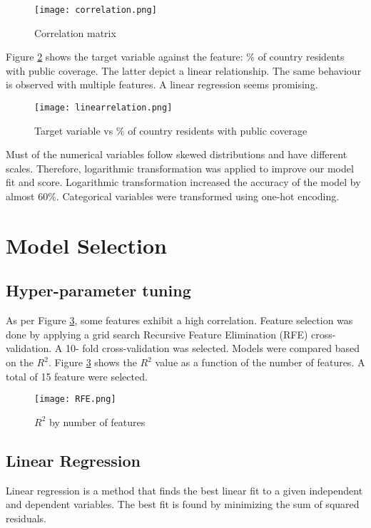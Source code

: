 \documentclass[twocolumn]{article}
\begin{document}
\begin{figure}
    \centering
    \texttt{[image: correlation.png]}
    \caption{Correlation matrix}
    \label{fig:corr}
\end{figure}

Figure \ref{fig:linear} shows the target variable against the feature: \% of country residents with public coverage.  The latter depict a linear relationship. The same behaviour is observed with multiple features. A linear regression seems promising.

\begin{figure}
    \centering
    \texttt{[image: linearrelation.png]}
    \caption{Target variable vs \% of country residents with public coverage}
    \label{fig:linear}
\end{figure}

Must of the numerical variables follow skewed distributions and have different scales. Therefore, logarithmic transformation was applied to improve our model fit and score. Logarithmic transformation increased the accuracy of the model by almost 60\%. Categorical variables were transformed using one-hot encoding. 

\section{Model Selection}\label{secmodel}

\subsection{Hyper-parameter tuning} \label{secpar}
As per Figure \ref{fig:rfe}, some features exhibit a high correlation. Feature selection was done by applying a grid search Recursive Feature Elimination (RFE) cross-validation. A 10- fold cross-validation was selected. Models were compared based on the $R^2$. Figure \ref{fig:rfe} shows the $R^2$ value as a function of the number of features. A total of 15 feature were selected.

\begin{figure}
    \centering
    \texttt{[image: RFE.png]}
    \caption{$R^2$ by number of features}
    \label{fig:rfe}
\end{figure}

\subsection{Linear Regression}
 Linear regression is a method that finds the best linear fit to a given independent and dependent variables. The best fit is found by minimizing the sum of squared residuals.
 
\end{document}
